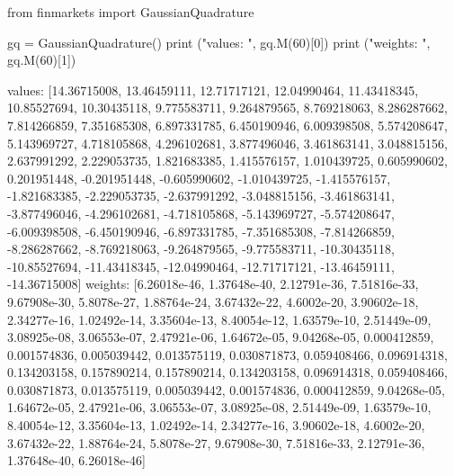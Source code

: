 \begin{ipython}
from finmarkets import GaussianQuadrature

gq = GaussianQuadrature()
print ("values: ", gq.M(60)[0])
print ("weights: ", gq.M(60)[1])

values: [14.36715008, 13.46459111, 12.71717121, 12.04990464, 11.43418345,
10.85527694, 10.30435118, 9.775583711, 9.264879565, 8.769218063, 8.286287662,
7.814266859, 7.351685308, 6.897331785, 6.450190946, 6.009398508, 5.574208647,
5.143969727, 4.718105868, 4.296102681, 3.877496046, 3.461863141, 3.048815156,
2.637991292, 2.229053735, 1.821683385, 1.415576157, 1.010439725, 0.605990602,
0.201951448, -0.201951448, -0.605990602, -1.010439725, -1.415576157,
-1.821683385, -2.229053735, -2.637991292, -3.048815156, -3.461863141,
-3.877496046, -4.296102681, -4.718105868, -5.143969727, -5.574208647,
-6.009398508, -6.450190946, -6.897331785, -7.351685308, -7.814266859,
-8.286287662, -8.769218063, -9.264879565, -9.775583711, -10.30435118,
-10.85527694, -11.43418345, -12.04990464, -12.71717121, -13.46459111,
-14.36715008]
weights: [6.26018e-46, 1.37648e-40, 2.12791e-36, 7.51816e-33, 9.67908e-30,
5.8078e-27, 1.88764e-24, 3.67432e-22, 4.6002e-20, 3.90602e-18, 2.34277e-16,
1.02492e-14, 3.35604e-13, 8.40054e-12, 1.63579e-10, 2.51449e-09, 3.08925e-08,
3.06553e-07, 2.47921e-06, 1.64672e-05, 9.04268e-05, 0.000412859, 0.001574836,
0.005039442, 0.013575119, 0.030871873, 0.059408466, 0.096914318, 0.134203158,
0.157890214, 0.157890214, 0.134203158, 0.096914318, 0.059408466, 0.030871873,
0.013575119, 0.005039442, 0.001574836, 0.000412859, 9.04268e-05, 1.64672e-05,
2.47921e-06, 3.06553e-07, 3.08925e-08, 2.51449e-09, 1.63579e-10, 8.40054e-12,
3.35604e-13, 1.02492e-14, 2.34277e-16, 3.90602e-18, 4.6002e-20, 3.67432e-22,
1.88764e-24, 5.8078e-27, 9.67908e-30, 7.51816e-33, 2.12791e-36, 1.37648e-40,
6.26018e-46]
\end{ipython}

